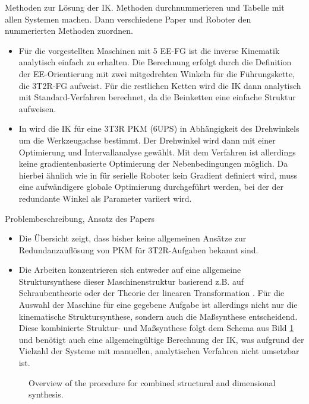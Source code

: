 \documentclass[robotics,article,submit,moreauthors,pdftex]{Definitions/mdpi}
\begin{document}
Methoden zur Lösung der IK. Methoden durchnummerieren und Tabelle mit allen Systemen machen. Dann verschiedene Paper und Roboter den nummerierten Methoden zuordnen.

\begin{itemize}
	\item Für die vorgestellten Maschinen mit 5 EE-FG \cite{LiuXuYaoXu2015,WenQinZhaLam2016,ZhengGaoZha2005,GaoSunZha2004,ChengWanZha2008,AlaghebandMahMilBen2015,BaerWei2006,Tale-MasoulehSaaGosTag2010,Tale-MasoulehGos2011} ist die inverse Kinematik analytisch einfach zu erhalten. Die Berechnung erfolgt durch die Definition der EE-Orientierung mit zwei mitgedrehten Winkeln für die Führungskette, die 3T2R-FG aufweist. Für die restlichen Ketten wird die IK dann analytisch mit Standard-Verfahren berechnet, da die Beinketten eine einfache Struktur aufweisen.
	\item In \cite{MerletPerDan2000} wird die IK für eine 3T3R PKM (6UPS) in Abhängigkeit des Drehwinkels um die Werkzeugachse bestimmt. Der Drehwinkel wird dann mit einer Optimierung und Intervallanalyse gewählt. Mit dem Verfahren ist allerdings keine gradientenbasierte Optimierung der Nebenbedingungen möglich. Da hierbei ähnlich wie in \cite{ZhuQuCaoYan2013,GuoDonKe2015} für serielle Roboter kein Gradient definiert wird, muss eine aufwändigere globale Optimierung durchgeführt werden, bei der der redundante Winkel als Parameter variiert wird.
\end{itemize}

Problembeschreibung, Ansatz des Papers
\begin{itemize}
	\item Die Übersicht zeigt, dass bisher keine allgemeinen Ansätze zur Redundanzauflösung von PKM für 3T2R-Aufgaben bekannt sind.
	\item Die Arbeiten konzentrieren sich entweder auf eine allgemeine Struktursynthese dieser Maschinenstruktur basierend z.B. auf Schraubentheorie \cite{KongGos2005} oder der Theorie der linearen Transformation \cite{Gogu2006}. Für die Auswahl der Maschine für eine gegebene Aufgabe ist allerdings nicht nur die kinematische Struktursynthese, sondern auch die Maßsynthese entscheidend. Diese kombinierte Struktur- und Maßsynthese folgt dem Schema aus Bild \ref{fig:structdimsynth} und benötigt auch eine allgemeingültige Berechnung der IK, was aufgrund der Vielzahl der Systeme mit manuellen, analytischen Verfahren nicht umsetzbar ist.
\end{itemize}


\begin{figure}[tb]
	
	\caption{Overview of the procedure for combined structural and dimensional synthesis.}
	\label{fig:structdimsynth}
\end{figure} 
\end{document}
